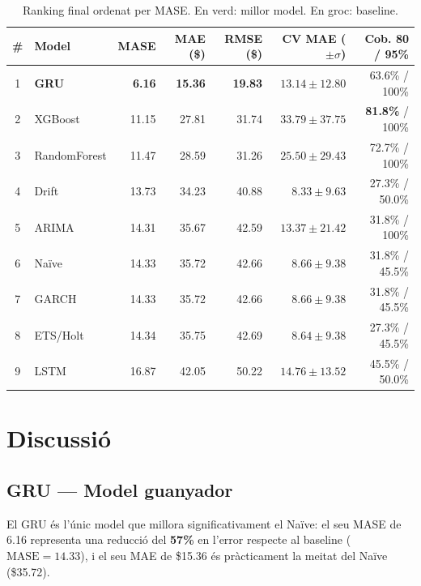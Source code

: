 \documentclass[12pt,a4paper]{article}
\begin{document}
\begin{table}[H]
\centering
\setlength{\tabcolsep}{5.5pt}
\begin{tabular}{clrrrrr}
\toprule
\textbf{\#} & \textbf{Model} & \textbf{MASE} & \textbf{MAE (\$)} & \textbf{RMSE (\$)} &
\textbf{CV MAE ($\pm\sigma$)} & \textbf{Cob. 80 / 95\%} \\
\midrule
\rowcolor{lightgreen}
1 & \textbf{GRU}    & \textbf{6.16}  & \textbf{15.36} & \textbf{19.83} & $13.14 \pm 12.80$ & 63.6\% / 100\% \\
2 & XGBoost         & 11.15 & 27.81 & 31.74 & $33.79 \pm 37.75$ & \textbf{81.8\%} / 100\% \\
3 & RandomForest    & 11.47 & 28.59 & 31.26 & $25.50 \pm 29.43$ & 72.7\% / 100\% \\
4 & Drift           & 13.73 & 34.23 & 40.88 & $8.33 \pm 9.63$   & 27.3\% / 50.0\% \\
5 & ARIMA           & 14.31 & 35.67 & 42.59 & $13.37 \pm 21.42$ & 31.8\% / 100\% \\
\rowcolor{lightyellow}
6 & Naïve  & 14.33 & 35.72 & 42.66 & $8.66 \pm 9.38$   & 31.8\% / 45.5\% \\
7 & GARCH           & 14.33 & 35.72 & 42.66 & $8.66 \pm 9.38$   & 31.8\% / 45.5\% \\
8 & ETS/Holt        & 14.34 & 35.75 & 42.69 & $8.64 \pm 9.38$   & 27.3\% / 45.5\% \\
9 & LSTM            & 16.87 & 42.05 & 50.22 & $14.76 \pm 13.52$ & 45.5\% / 50.0\% \\
\bottomrule
\end{tabular}
\caption{Ranking final ordenat per MASE. En verd: millor model. En groc: baseline.}
\end{table}

\section{Discussió}

\subsection{GRU — Model guanyador}

El GRU és l'únic model que millora significativament el Naïve: el seu MASE de 6.16 representa
una reducció del \textbf{57\%} en l'error respecte al baseline ($\text{MASE} = 14.33$), i el
seu MAE de \$15.36 és pràcticament la meitat del Naïve (\$35.72).
\end{document}
